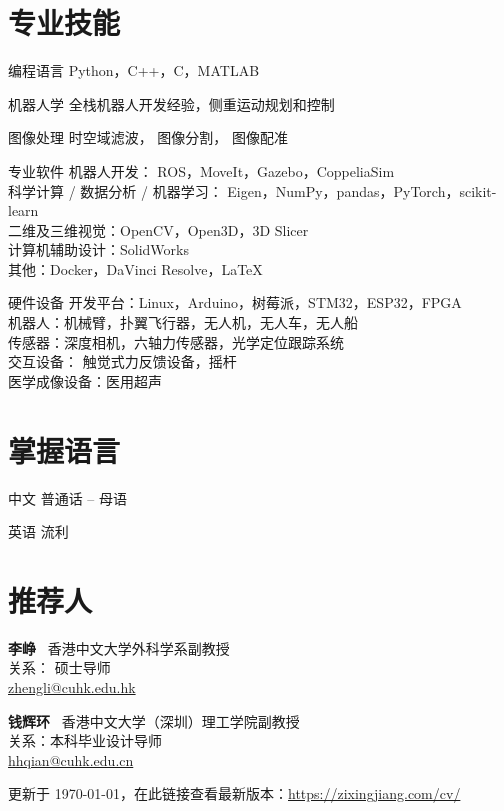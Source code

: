 \documentclass[utf8, 11pt,letterpaper]{report}
\newcommand{\listitemspace}{0.25em}
\renewenvironment{itemize}
{\begin{list}{}{\setlength{\leftmargin}{0em}
			\setlength{\parskip}{0em}
			\setlength{\itemsep}{\listitemspace}
			\setlength{\parsep}{\listitemspace}}}
	{\end{list}}
\begin{document}
\section*{专业技能}
\begin{tablist}
	\item[编程语言] \tab Python，C++，C，MATLAB
	\item[机器人学] \tab 全栈机器人开发经验，侧重运动规划和控制
	\item [图像处理] \tab 时空域滤波， 图像分割， 图像配准
	\item[专业软件] \tab 机器人开发： ROS，MoveIt，Gazebo，CoppeliaSim\\
	科学计算 / 数据分析 / 机器学习： Eigen，NumPy，pandas，PyTorch，scikit-learn\\
	二维及三维视觉：OpenCV，Open3D，3D Slicer\\
	计算机辅助设计：SolidWorks\\
	其他：Docker，DaVinci Resolve，\LaTeX
	\item[硬件设备] \tab 开发平台：Linux，Arduino，树莓派，STM32，ESP32，FPGA\\
	机器人：机械臂，扑翼飞行器，无人机，无人车，无人船\\ 
	传感器：深度相机，六轴力传感器，光学定位跟踪系统\\
	交互设备： 触觉式力反馈设备，摇杆\\
	医学成像设备：医用超声
\end{tablist}


\section*{掌握语言}
\begin{tablist}
	\item[中文] \tab 普通话 -- 母语
	\item[英语] \tab 流利
\end{tablist}
\newpage
\section*{推荐人}
\begin{itemize}
	\item \textbf{李峥}~ 香港中文大学外科学系副教授\\
	关系： 硕士导师\\
	{\scriptsize \faEnvelope}\href{mailto:zhengli@cuhk.edu.hk}{zhengli@cuhk.edu.hk}

	\vspace{10pt}
	\item \textbf{钱辉环}~ 香港中文大学（深圳）理工学院副教授\\
	关系：本科毕业设计导师\\
	{\scriptsize \faEnvelope}\href{mailto:hhqian@cuhk.edu.cn}{hhqian@cuhk.edu.cn}\\

\end{itemize}
	
\begin{center}
	\vfill
	更新于 \monthyeardate\today，在此链接查看最新版本：\href{https://zixingjiang.com/cv/}{https://zixingjiang.com/cv/}
\end{center}
	
\end{document}
